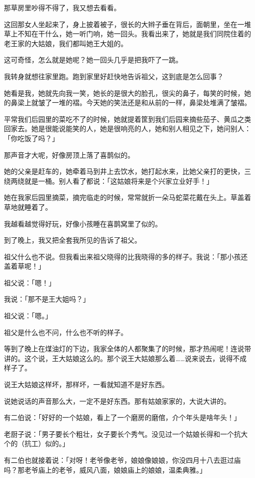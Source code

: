\documentclass[UTF8]{ctexart}
\begin{document}
那草房里吵得不得了，我又想去看看。

这回那女人坐起来了，身上披着被子，很长的大辫子垂在背后，面朝里，坐在一堆草上不知在干什么，她一听门响，她一回头。我看出来了，她就是我们同院住着的老王家的大姑娘，我们都叫她王大姐的。

这可奇怪，怎么就是她呢？她一回头几乎是把我吓了一跳。

我转身就想往家里跑。跑到家里好赶快地告诉祖父，这到底是怎么回事？

她看是我，她就先向我一笑，她长的是很大的脸孔，很尖的鼻子，每笑的时候，她的鼻梁上就皱了一堆的褶。今天她的笑法还是和从前的一样，鼻梁处堆满了皱褶。

平常我们后园里的菜吃不了的时候，她就提着筐到我们后园来摘些茄子、黄瓜之类回家去。她是很能说能笑的人，她是很响亮的人，她和别人相见之下，她问别人：「你吃饭了吗？」

那声音才大呢，好像房顶上落了喜鹊似的。

她的父亲是赶车的，她牵着马到井上去饮水，她打起水来，比她父亲打的更快，三绕两绕就是一桶。别人看了都说：「这姑娘将来是个兴家立业好手！」

她在我家后园里摘菜，摘完临走的时候，常常就折一朵马蛇菜花戴在头上。草盖着草地就睡着了。

我越看越觉得好玩，好像小孩睡在喜鹊窝里了似的。

到了晚上，我又把全套我所见的告诉了祖父。

祖父什么也不说。但我看出来祖父晓得的比我晓得的多的样子。我说：「那小孩还盖着草呢！」

祖父说：「嗯！」

我说：「那不是王大姐吗？」

祖父说：「嗯。」

祖父是什么也不问，什么也不听的样子。

等到了晚上在煤油灯的下边，我家全体的人都聚集了的时候，那才热闹呢！连说带讲的。这个说，王大姑娘这么的。那个说王大姑娘那么着……说来说去，说得不成样子了。

说王大姑娘这样坏，那样坏，一看就知道不是好东西。

说她说话的声音那么大，一定不是好东西。那有姑娘家家的，大说大讲的。

有二伯说：「好好的一个姑娘，看上了一个磨房的磨倌，介个年头是啥年头！」

老厨子说：「男子要长个粗壮，女子要长个秀气。没见过一个姑娘长得和一个抗大个的（抗工）似的。」

有二伯也就接着说：「对呀！老爷像老爷，娘娘像娘娘，你没四月十八去逛过庙吗？那老爷庙上的老爷，威风八面，娘娘庙上的娘娘，温柔典雅。」
\end{document}
